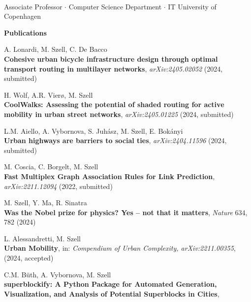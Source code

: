 \documentclass[10pt,a4paper]{article}
\def\name{Michael Szell}
\begin{document}
\begin{center}
 \\[8px]
 Associate Professor $\cdot$ Computer Science Department $\cdot$ IT University of Copenhagen
\vspace{26.8pt}



\vspace{8pt}

{\large \bf Publications}
\end{center}

\begin{etaremune}
\item A. Lonardi, M. Szell, C. De Bacco\\
    \textbf{Cohesive urban bicycle infrastructure design through optimal transport routing in multilayer networks}, 
    \textit{arXiv:2405.02052} (2024, submitted)
\item H. Wolf, A.R. Vierø, M. Szell\\
    \textbf{CoolWalks: Assessing the potential of shaded routing for active mobility in urban street networks}, 
    \textit{arXiv:2405.01225} (2024, submitted)
\item L.M. Aiello, A. Vybornova, S. Juhász, M. Szell, E. Bokányi\\
    \textbf{Urban highways are barriers to social ties}, 
    \textit{arXiv:2404.11596} (2024, submitted)
\item M. Coscia, C. Borgelt, M. Szell\\
    \textbf{Fast Multiplex Graph Association Rules for Link Prediction}, 
    \textit{arXiv:2211.12094} (2022, submitted)
\item M. Szell, Y. Ma, R. Sinatra\\
    \textbf{Was the Nobel prize for physics? Yes -- not that it matters},
    \textit{Nature} 634, 782 (2024)
\item L. Alessandretti, M. Szell\\
    \textbf{Urban Mobility}, in: \textit{Compendium of Urban Complexity, arXiv:2211.00355}, (2024, accepted)
\item C.M. Büth, A. Vybornova, M. Szell\\
    \textbf{superblockify: A Python Package for Automated Generation, Visualization, and Analysis of Potential Superblocks in Cities}, 

\end{etaremune}
\end{document}
